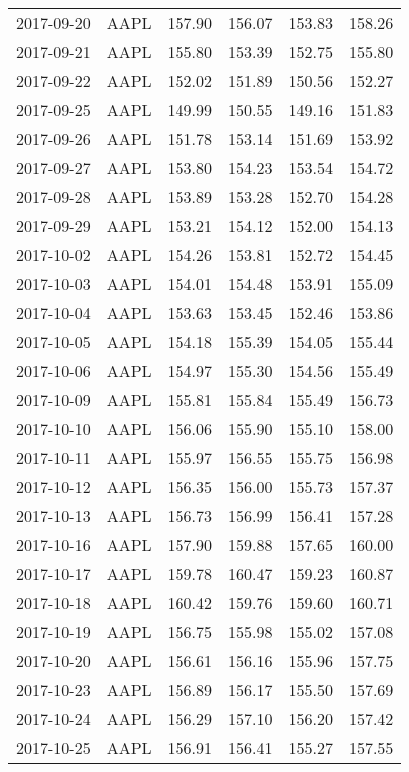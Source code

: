\documentclass[a4paper, 12pt]{report}
\begin{document}
\begin{appendices}
\begin{longtable}{llllll}
  2017-09-20 & AAPL & 157.90 & 156.07 & 153.83 & 158.26 \\ 
  2017-09-21 & AAPL & 155.80 & 153.39 & 152.75 & 155.80 \\ 
  2017-09-22 & AAPL & 152.02 & 151.89 & 150.56 & 152.27 \\ 
  2017-09-25 & AAPL & 149.99 & 150.55 & 149.16 & 151.83 \\ 
  2017-09-26 & AAPL & 151.78 & 153.14 & 151.69 & 153.92 \\ 
  2017-09-27 & AAPL & 153.80 & 154.23 & 153.54 & 154.72 \\ 
  2017-09-28 & AAPL & 153.89 & 153.28 & 152.70 & 154.28 \\ 
  2017-09-29 & AAPL & 153.21 & 154.12 & 152.00 & 154.13 \\ 
  2017-10-02 & AAPL & 154.26 & 153.81 & 152.72 & 154.45 \\ 
  2017-10-03 & AAPL & 154.01 & 154.48 & 153.91 & 155.09 \\ 
  2017-10-04 & AAPL & 153.63 & 153.45 & 152.46 & 153.86 \\ 
  2017-10-05 & AAPL & 154.18 & 155.39 & 154.05 & 155.44 \\ 
  2017-10-06 & AAPL & 154.97 & 155.30 & 154.56 & 155.49 \\ 
  2017-10-09 & AAPL & 155.81 & 155.84 & 155.49 & 156.73 \\ 
  2017-10-10 & AAPL & 156.06 & 155.90 & 155.10 & 158.00 \\ 
  2017-10-11 & AAPL & 155.97 & 156.55 & 155.75 & 156.98 \\ 
  2017-10-12 & AAPL & 156.35 & 156.00 & 155.73 & 157.37 \\ 
  2017-10-13 & AAPL & 156.73 & 156.99 & 156.41 & 157.28 \\ 
  2017-10-16 & AAPL & 157.90 & 159.88 & 157.65 & 160.00 \\ 
  2017-10-17 & AAPL & 159.78 & 160.47 & 159.23 & 160.87 \\ 
  2017-10-18 & AAPL & 160.42 & 159.76 & 159.60 & 160.71 \\ 
  2017-10-19 & AAPL & 156.75 & 155.98 & 155.02 & 157.08 \\ 
  2017-10-20 & AAPL & 156.61 & 156.16 & 155.96 & 157.75 \\ 
  2017-10-23 & AAPL & 156.89 & 156.17 & 155.50 & 157.69 \\ 
  2017-10-24 & AAPL & 156.29 & 157.10 & 156.20 & 157.42 \\ 
  2017-10-25 & AAPL & 156.91 & 156.41 & 155.27 & 157.55 \\ 

\end{longtable}
\end{appendices}
\end{document}
